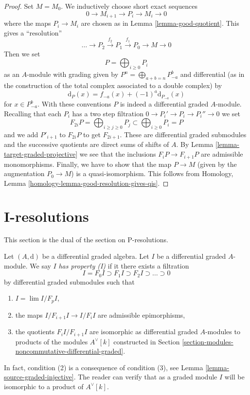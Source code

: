 \begin{proof}
Set $M = M_0$. We inductively choose short exact sequences
$$
0 \to M_{i + 1} \to P_i \to M_i \to 0
$$
where the maps $P_i \to M_i$ are chosen as in Lemma \ref{lemma-good-quotient}.
This gives a ``resolution''
$$
\ldots \to P_2 \xrightarrow{f_2} P_1 \xrightarrow{f_1} P_0 \to M \to 0
$$
Then we set
$$
P = \bigoplus\nolimits_{i \geq 0} P_i
$$
as an $A$-module with grading given by
$P^n = \bigoplus_{a + b = n} P_{-a}^b$ and
differential (as in the construction of the total complex associated
to a double complex) by
$$
\text{d}_P(x) = f_{-a}(x) + (-1)^a \text{d}_{P_{-a}}(x)
$$
for $x \in P_{-a}^b$. With these conventions $P$ is indeed a differential
graded $A$-module. Recalling that each $P_i$ has a two step filtration
$0 \to P_i' \to P_i \to P_i'' \to 0$ we set
$$
F_{2i}P = \bigoplus\nolimits_{i \geq j \geq 0} P_j
\subset
\bigoplus\nolimits_{i \geq 0} P_i = P
$$
and we add $P'_{i + 1}$ to $F_{2i}P$ to get $F_{2i + 1}$.
These are differential graded submodules and the successive quotients
are direct sums of shifts of $A$. By
Lemma \ref{lemma-target-graded-projective} we see that
the inclusions $F_iP \to F_{i + 1}P$ are admissible monomorphisms.
Finally, we have to show that the map $P \to M$ (given by the
augmentation $P_0 \to M$) is a quasi-isomorphism. This follows from
Homology, Lemma \ref{homology-lemma-good-resolution-gives-qis}.
\end{proof}





\section{I-resolutions}
\label{section-I-resolutions}

\noindent
This section is the dual of the section on P-resolutions.

\medskip\noindent
Let $(A, \text{d})$ be a differential graded algebra.
Let $I$ be a differential graded $A$-module. We say $I$
{\it has property (I)} if it there exists a filtration
$$
I = F_0I \supset F_1I \supset F_2I \supset \ldots \supset 0
$$
by differential graded submodules such that
\begin{enumerate}
\item $I = \lim I/F_pI$,
\item the maps $I/F_{i + 1}I \to I/F_iI$ are admissible epimorphisms,
\item the quotients $F_iI/F_{i + 1}I$ are isomorphic as differential
graded $A$-modules to products of the modules $A^\vee[k]$ constructed
in Section \ref{section-modules-noncommutative-differential-graded}.
\end{enumerate}
In fact, condition (2) is a consequence of condition (3), see
Lemma \ref{lemma-source-graded-injective}. The reader can verify that as
a graded module $I$ will be isomorphic to a product of $A^\vee[k]$.


